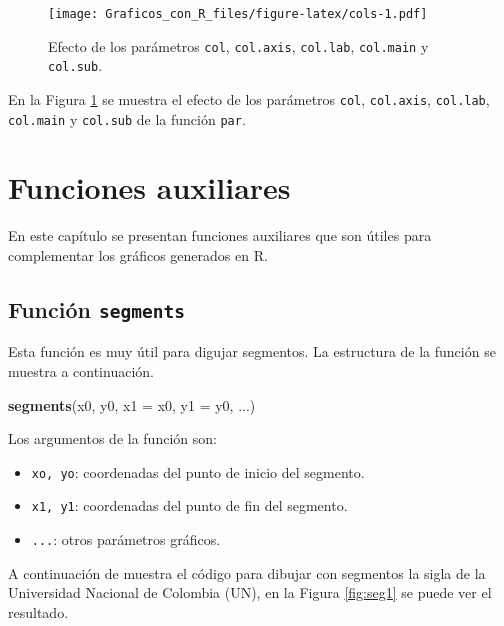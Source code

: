 \documentclass[10pt,]{krantz}
\makeatletter
\newenvironment{Shaded}{\begin{snugshade}}{\end{snugshade}}
\newcommand{\KeywordTok}[1]{\textcolor[rgb]{0.13,0.29,0.53}{\textbf{#1}}}
\newcommand{\DataTypeTok}[1]{\textcolor[rgb]{0.13,0.29,0.53}{#1}}
\newcommand{\NormalTok}[1]{#1}
\providecommand{\tightlist}{%
  \setlength{\itemsep}{0pt}\setlength{\parskip}{0pt}}
\let\proglang=\textsf
\newenvironment{kframe}{%
\medskip{}
\setlength{\fboxsep}{.8em}
 \def\at@end@of@kframe{}%
 \ifinner\ifhmode%
  \def\at@end@of@kframe{\end{minipage}}%
  \begin{minipage}{\columnwidth}%
 \fi\fi%
 \def\FrameCommand##1{\hskip\@totalleftmargin \hskip-\fboxsep
 \colorbox{shadecolor}{##1}\hskip-\fboxsep
     \hskip-\linewidth \hskip-\@totalleftmargin \hskip\columnwidth}%
 \MakeFramed {\advance\hsize-\width
   \@totalleftmargin\z@ \linewidth\hsize
   \@setminipage}}%
 {\par\unskip\endMakeFramed%
 \at@end@of@kframe}
\renewenvironment{Shaded}{\begin{kframe}}{\end{kframe}}
\makeatother
\begin{document}
\begin{figure}
\centering
\texttt{[image: Graficos\_con\_R\_files/figure-latex/cols-1.pdf]}
\caption{\label{fig:cols}Efecto de los parámetros \texttt{col},
\texttt{col.axis}, \texttt{col.lab}, \texttt{col.main} y
\texttt{col.sub}.}
\end{figure}

En la Figura \ref{fig:cols} se muestra el efecto de los parámetros
\texttt{col}, \texttt{col.axis}, \texttt{col.lab}, \texttt{col.main} y
\texttt{col.sub} de la función \texttt{par}.

\chapter{Funciones auxiliares}\label{funciones-auxiliares}

En este capítulo se presentan funciones auxiliares que son útiles para
complementar los gráficos generados en \proglang{R}.

\section{\texorpdfstring{Función \texttt{segments} 
}{Función segments  }}\label{funcion-segments}

Esta función es muy útil para digujar segmentos. La estructura de la
función se muestra a continuación.

\begin{Shaded}
\begin{Highlighting}[]
\KeywordTok{segments}\NormalTok{(x0, y0, }\DataTypeTok{x1 =}\NormalTok{ x0, }\DataTypeTok{y1 =}\NormalTok{ y0, ...)}
\end{Highlighting}
\end{Shaded}

Los argumentos de la función son:

\begin{itemize}
\tightlist
\item
  \texttt{xo,\ yo}: coordenadas del punto de inicio del segmento.
\item
  \texttt{x1,\ y1}: coordenadas del punto de fin del segmento.
\item
  \texttt{...}: otros parámetros gráficos.
\end{itemize}

A continuación de muestra el código para dibujar con segmentos la sigla
de la Universidad Nacional de Colombia (UN), en la Figura \ref{fig:seg1}
se puede ver el resultado.
\end{document}
